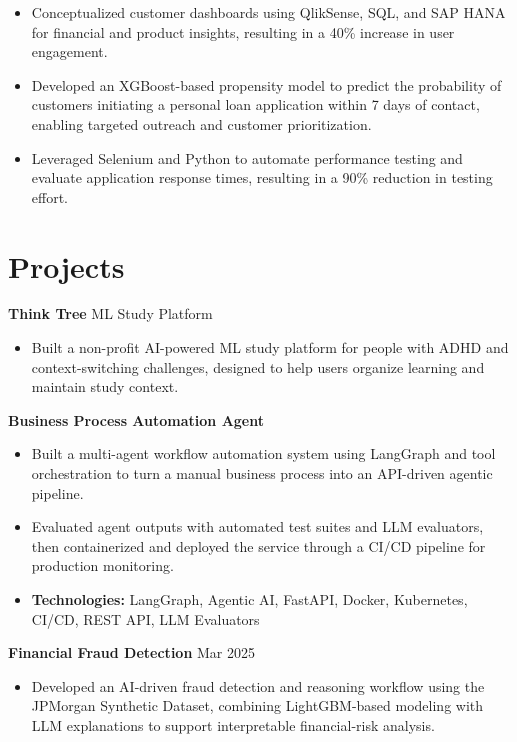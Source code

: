 \documentclass[10pt,a4paper]{article}
\begin{document}
\begin{itemize}
  \item Conceptualized customer dashboards using QlikSense, SQL, and SAP HANA for financial and product insights, resulting in a 40\% increase in user engagement.
  \item Developed an XGBoost-based propensity model to predict the probability of customers initiating a personal loan application within 7 days of contact, enabling targeted outreach and customer prioritization.
  \item Leveraged Selenium and Python to automate performance testing and evaluate application response times, resulting in a 90\% reduction in testing effort.
\end{itemize}


\section{Projects}
\textbf{Think Tree} \textbar{} ML Study Platform\par
\begin{itemize}
  \item Built a non-profit AI-powered ML study platform for people with ADHD and context-switching challenges, designed to help users organize learning and maintain study context.
\end{itemize}
\textbf{Business Process Automation Agent}\par
\begin{itemize}
  \item Built a multi-agent workflow automation system using LangGraph and tool orchestration to turn a manual business process into an API-driven agentic pipeline.
  \item Evaluated agent outputs with automated test suites and LLM evaluators, then containerized and deployed the service through a CI/CD pipeline for production monitoring.
  \item \textbf{Technologies:} LangGraph, Agentic AI, FastAPI, Docker, Kubernetes, CI/CD, REST API, LLM Evaluators
\end{itemize}
\textbf{Financial Fraud Detection} \textbar{} Mar 2025\par
\begin{itemize}
  \item Developed an AI-driven fraud detection and reasoning workflow using the JPMorgan Synthetic Dataset, combining LightGBM-based modeling with LLM explanations to support interpretable financial-risk analysis.
\end{itemize}
\end{document}
